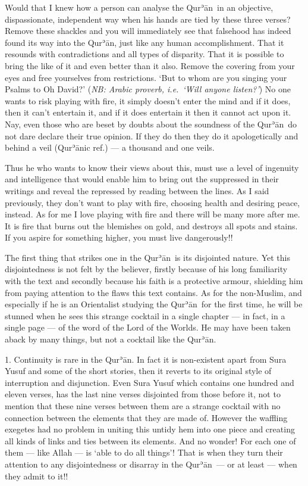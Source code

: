 \documentclass[12pt]{memoir}
\def\´{ʾ} %
\newcommand{\ar}[1]{\RL{\arabicfont#1}}
\def \Quran{Qur\-\´ān} %
\def\–{-\hskip0pt}
\def\pardivider{\centerline{\ar{۞۞۞}}} %
\newcommand{\NB}[1]{\emph{\small NB: #1}}
\begin{document}
Would that I knew how a person can analyse the \Quran\ in an objective,
dispassionate, independent way when his hands are tied by these three verses?
Remove these shackles and you will immediately see that falsehood
has indeed found its way into the \Quran,
just like any human accomplishment.
That it resounds with contradictions and all types of disparity.
That it is possible to bring the like of it and even better than it also.
Remove the covering from your eyes and free yourselves from restrictions.
‘But to whom are you singing your Psalms to Oh David?’
(\NB{Arabic proverb, i.e.\ ‘Will anyone listen?’})
No one wants to risk playing with fire,
it simply doesn’t enter the mind and if it does,
then it can’t entertain it, and if it does entertain it
then it cannot act upon it.
Nay, even those who are beset by doubts about the soundness of the \Quran\
do not dare declare their true opinion.
If they do then they do it apologetically and behind a veil (\Quran{}ic ref.) —
a thousand and one veils.

Thus he who wants to know their views about this,
must use a level of ingenuity and intelligence
that would enable him to bring out the suppressed in their writings
and reveal the repressed by reading between the lines.
As I said previously, they don’t want to play with fire,
choosing health and desiring peace, instead.
As for me I love playing with fire and there will be many more after me.
It is fire that burns out the blemishes on gold,
and destroys all spots and stains.
If you aspire for something higher, you must live dangerously!!

\pardivider

The first thing that strikes one in the \Quran\ is its disjointed nature.
Yet this disjointedness is not felt by the believer,
firstly because of his long familiarity with the text and secondly
because his faith is a protective armour,
shielding him from paying attention to the flaws this text contains.
As for the non\–Muslim, and especially if he is an Orientalist
studying the \Quran\ for the first time,
he will be stunned when he sees this strange cocktail in a single chapter —
in fact, in a single page — of the word of the Lord of the Worlds.
He may have been taken aback by many things,
but not a cocktail like the \Quran.

1. Continuity is rare in the \Quran.
In fact it is non\–existent apart from Sura Yusuf
and some of the short stories,
then it reverts to its original style of interruption and disjunction.
Even Sura Yusuf which contains one hundred and eleven verses,
has the last nine verses disjointed from those before it,
not to mention that these nine verses between them are a strange cocktail
with no connection between the elements that they are made of.
However the waffling exegetes had no problem in uniting this untidy hem
into one piece and creating all kinds of links and ties between its elements.
And no wonder! For each one of them — like Allah — is ‘able to do all things’!
That is when they turn their attention to any disjointedness
or disarray in the \Quran\ — or at least — when they admit to it!!
\end{document}
